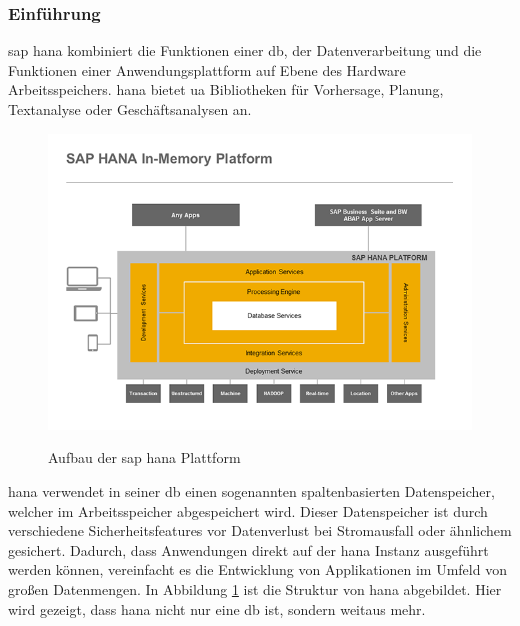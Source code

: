 \subsubsection{Einführung}
\label{sec:db-hana-intro}
\gls{sap} \gls{hana} kombiniert die Funktionen einer \gls{db}, der Datenverarbeitung und die Funktionen einer Anwendungsplattform auf Ebene des Hardware Arbeitsspeichers. \gls{hana} bietet \gls{ua} Bibliotheken für Vorhersage, Planung, Textanalyse oder Geschäftsanalysen an.\\

\begin{figure}[H]
	\begin{center}
	\includegraphics[width=1\linewidth]{grafiken/hana-features-overview.png}
	\vspace{-20pt}
	\caption{Aufbau der \gls{sap} \gls{hana} Plattform \cite{SAPHanaAbout}}
	\vspace{-10pt}
	\label{abb:SAPHanaAbout}
	\end{center}
\end{figure}

\gls{hana} verwendet in seiner \gls{db} einen sogenannten spaltenbasierten Datenspeicher, welcher im Arbeitsspeicher abgespeichert wird. Dieser Datenspeicher ist durch verschiedene Sicherheitsfeatures vor Datenverlust bei Stromausfall oder ähnlichem gesichert.
Dadurch, dass Anwendungen direkt auf der \gls{hana} Instanz ausgeführt werden können, vereinfacht es die Entwicklung von Applikationen im Umfeld von großen Datenmengen. In Abbildung \ref{abb:SAPHanaAbout} ist die Struktur von \gls{hana} abgebildet. Hier wird gezeigt, dass \gls{hana} nicht nur eine \gls{db} ist, sondern weitaus mehr.

